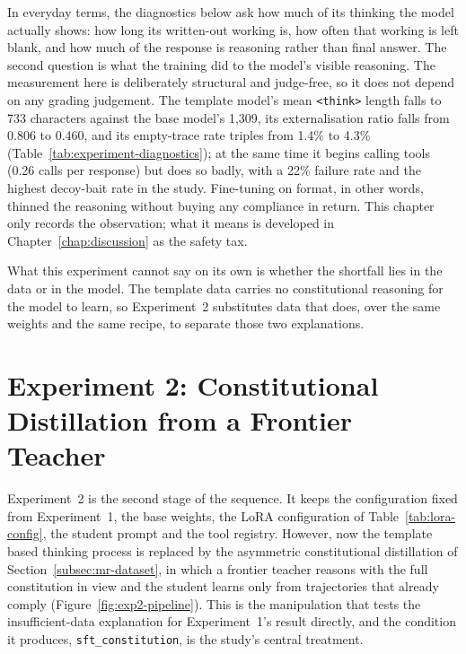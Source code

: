 In everyday terms, the diagnostics below ask how much of its thinking the model actually shows: how long its written-out working is, how often that working is left blank, and how much of the response is reasoning rather than final answer. The second question is what the training did to the model's visible reasoning. The measurement here is deliberately structural and judge-free, so it does not depend on any grading judgement. The template model's mean \texttt{<think>} length falls to 733 characters against the base model's 1,309, its externalisation ratio falls from 0.806 to 0.460, and its empty-trace rate triples from 1.4\% to 4.3\% (Table~\ref{tab:experiment-diagnostics}); at the same time it begins calling tools (0.26 calls per response) but does so badly, with a 22\% failure rate and the highest decoy-bait rate in the study. Fine-tuning on format, in other words, thinned the reasoning without buying any compliance in return. This chapter only records the observation; what it means is developed in Chapter~\ref{chap:discussion} as the safety tax.

What this experiment cannot say on its own is whether the shortfall lies in the data or in the model. The template data carries no constitutional reasoning for the model to learn, so Experiment~2 substitutes data that does, over the same weights and the same recipe, to separate those two explanations.

\section{Experiment 2: Constitutional Distillation from a Frontier Teacher}
\label{sec:mr-exp2}

Experiment~2 is the second stage of the sequence. It keeps the configuration fixed from Experiment~1, the base weights, the LoRA configuration of Table~\ref{tab:lora-config}, the student prompt and the tool registry. However, now the template based thinking process is replaced by the asymmetric constitutional distillation of Section~\ref{subsec:mr-dataset}, in which a frontier teacher reasons with the full constitution in view and the student learns only from trajectories that already comply (Figure~\ref{fig:exp2-pipeline}). This is the manipulation that tests the insufficient-data explanation for Experiment~1's result directly, and the condition it produces, \texttt{sft\_constitution}, is the study's central treatment.

